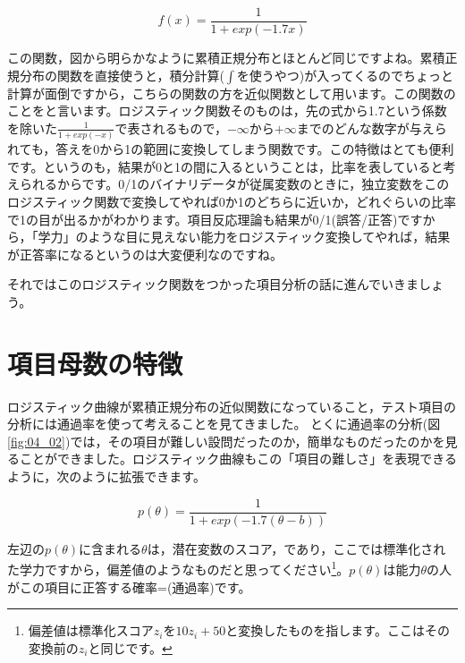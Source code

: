 \documentclass{ltjsbook}
\begin{document}
\[ f(x) = \frac{1}{1+exp(-1.7x)} \]

この関数，図から明らかなように累積正規分布とほとんど同じですよね。累積正規分布の関数を直接使うと，積分計算($\int$を使うやつ)が入ってくるのでちょっと計算が面倒ですから，こちらの関数の方を近似関数として用います。この関数のことをと言います。ロジスティック関数そのものは，先の式から1.7という係数を除いた$\frac{1}{1+exp(-x)}$で表されるもので，$-\infty$から$+\infty$までのどんな数字が与えられても，答えを0から1の範囲に変換してしまう関数です。この特徴はとても便利です。というのも，結果が0と1の間に入るということは，比率を表していると考えられるからです。0/1のバイナリデータが従属変数のときに，独立変数をこのロジスティック関数で変換してやれば0か1のどちらに近いか，どれぐらいの比率で1の目が出るかがわかります。項目反応理論も結果が0/1(誤答/正答)ですから，「学力」のような目に見えない能力をロジスティック変換してやれば，結果が正答率になるというのは大変便利なのですね。

それではこのロジスティック関数をつかった項目分析の話に進んでいきましょう。

\section{項目母数の特徴}
ロジスティック曲線が累積正規分布の近似関数になっていること，テスト項目の分析には通過率を使って考えることを見てきました。
とくに通過率の分析(図\ref{fig:04_02})では，その項目が難しい設問だったのか，簡単なものだったのかを見ることができました。ロジスティック曲線もこの「項目の難しさ」を表現できるように，次のように拡張できます。

\[ p(\theta) = \frac{1}{1+exp(-1.7 (\theta - b))} \]

左辺の$p(\theta)$に含まれる$\theta$は，潜在変数のスコア，であり，ここでは標準化された学力ですから，偏差値のようなものだと思ってください\footnote{偏差値は標準化スコア$z_i$を$10z_i+50$と変換したものを指します。ここはその変換前の$z_i$と同じです。}。$p(\theta)$は能力$\theta$の人がこの項目に正答する確率=(通過率)です。
\end{document}
